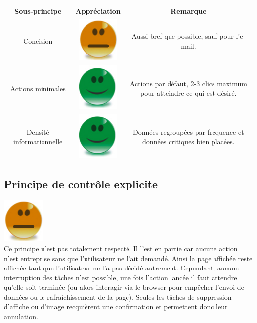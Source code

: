 \documentclass{article}
\begin{document}
\begin{sffamily}
\begin{center}
\begin{tabular}{c|c|c}
\textbf{Sous-principe} & \textbf{Appréciation} & \textbf{Remarque} \\
\hline
Concision & \includegraphics[scale=0.365]{mid.png} & Aussi bref que possible, sauf pour l'e-mail. \\
\hline
Actions minimales & \includegraphics[scale=0.27]{good.png} & Actions par défaut, 2-3 clics maximum pour atteindre ce qui est désiré.\\
\hline
Densité informationnelle & \includegraphics[scale=0.27]{good.png} & Données regroupées par fréquence et données critiques bien placées. \\
\end{tabular}
\end{center}

\subsection{Principe de contrôle explicite}

\includegraphics[scale=0.365]{mid.png} \\

Ce principe n'est pas totalement respecté. Il l'est en partie car aucune action n'est entreprise sans que l'utilisateur ne l'ait demandé. Ainsi la page affichée reste 
affichée tant que l'utilisateur ne l'a pas décidé autrement. Cependant, aucune interruption des tâches n'est possible, une fois l'action lancée il faut attendre qu'elle soit 
terminée (ou alors interagir via le browser pour empêcher l'envoi de données ou le rafraîchissement de la page). Seules les tâches de suppression d'affiche ou d'image 
recquièrent une confirmation et permettent donc leur annulation.


\end{sffamily}
\end{document}
